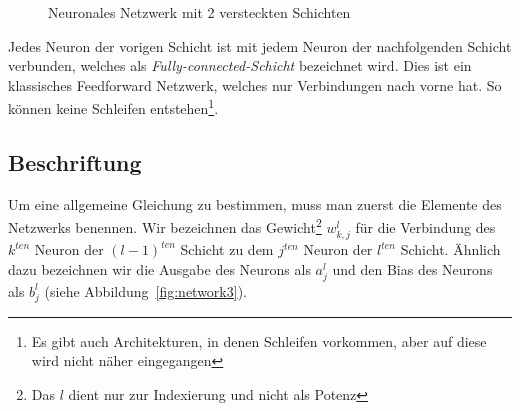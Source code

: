 \documentclass[12pt,a4paper]{report}
\begin{document}
\begin{figure}[!h]
    \caption{Neuronales Netzwerk mit 2 versteckten Schichten}
    \label{fig:network2}
\end{figure}
Jedes Neuron der vorigen Schicht ist mit jedem Neuron der nachfolgenden Schicht verbunden,
welches als \textit{Fully-connected-Schicht} bezeichnet wird.
Dies ist ein klassisches Feedforward Netzwerk,
welches nur Verbindungen nach vorne hat. So können keine Schleifen entstehen\footnote{Es gibt auch Architekturen, in denen Schleifen vorkommen,
aber auf diese wird nicht näher eingegangen}.

\subsection{Beschriftung}

Um eine allgemeine Gleichung zu bestimmen, muss man zuerst die Elemente des Netzwerks benennen.
Wir bezeichnen das Gewicht\footnote{Das $l$ dient nur zur Indexierung und nicht als Potenz} $w^l_{k,j}$ für die Verbindung des $k^{ten}$ Neuron der $(l-1)^{ten}$ Schicht
zu dem $j^{ten}$ Neuron der $l^{ten}$ Schicht.
Ähnlich dazu bezeichnen wir die Ausgabe des Neurons als $a^l_j$ und den Bias des Neurons als $b^l_j$ (siehe Abbildung~\ref{fig:network3}).
\end{document}

